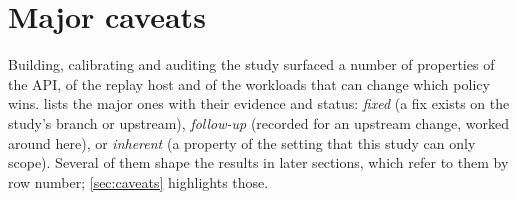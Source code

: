 %

\section{Major caveats}
\label{app:caveats}

Building, calibrating and auditing the study surfaced a number of properties of the API, of the
replay host and of the workloads that can change which policy wins.  lists the
major ones with their evidence and status: \emph{fixed} (a fix exists on the study's branch or
upstream), \emph{follow-up} (recorded for an upstream change, worked around here), or
\emph{inherent} (a property of the setting that this study can only scope). Several of them shape
the results in later sections, which refer to them by row number; \cref{sec:caveats} highlights
those.

